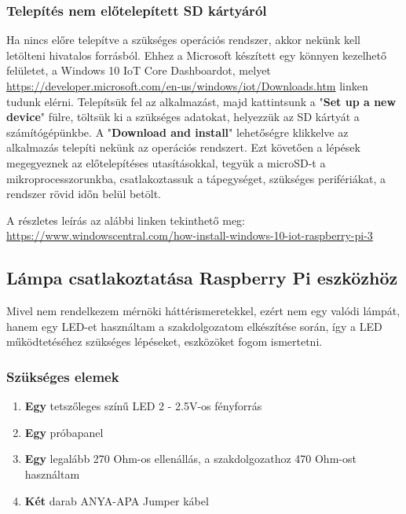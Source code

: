 \documentclass[a4paper,12pt]{report}
\begin{document}
    \subsubsection{Telepítés nem előtelepített SD kártyáról}
    Ha nincs előre telepítve a szükséges operációs rendszer, akkor nekünk kell letölteni hivatalos forrásból.
    Ehhez a Microsoft készített egy könnyen kezelhető felületet, a Windows 10 IoT Core Dashboardot, melyet
    \url{https://developer.microsoft.com/en-us/windows/iot/Downloads.htm} linken tudunk elérni.
    Telepítsük fel az alkalmazást, majd kattintsunk a "\textbf{Set up a new device}" fülre, töltsük ki a szükséges adatokat, helyezzük
    az SD kártyát a számítógépünkbe. A "\textbf{Download and install}" lehetőségre klikkelve az alkalmazás telepíti nekünk
    az operációs rendszert.
    Ezt követően a lépések megegyeznek az előtelepítéses utasításokkal, tegyük a microSD-t a mikroprocesszorunkba, csatlakoztassuk
    a tápegységet, szükséges perifériákat, a rendszer rövid időn belül betölt.

    A részletes leírás az alábbi linken tekinthető meg: \url{https://www.windowscentral.com/how-install-windows-10-iot-raspberry-pi-3}

    \subsection{Lámpa csatlakoztatása Raspberry Pi eszközhöz}
    Mivel nem rendelkezem mérnöki háttérismeretekkel, ezért nem egy valódi lámpát, hanem egy LED-et használtam a szakdolgozatom
    elkészítése során, így a LED működtetéséhez szükséges lépéseket, eszközöket fogom ismertetni.

    \subsubsection{Szükséges elemek}

    \begin{enumerate}
        \item \textbf{Egy} tetszőleges színű LED 2 - 2.5V-os fényforrás
        \item \textbf{Egy} próbapanel
        \item \textbf{Egy} legalább 270 Ohm-os ellenállás, a szakdolgozathoz 470 Ohm-ost használtam
        \item \textbf{Két} darab ANYA-APA Jumper kábel
    \end{enumerate}
\end{document}
